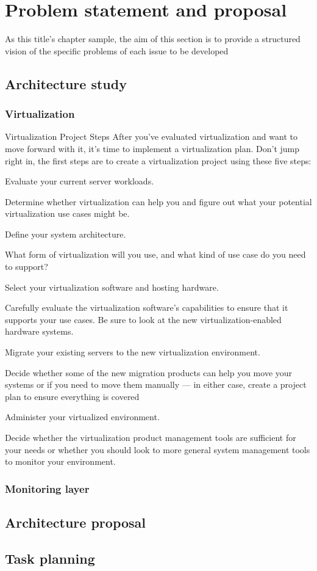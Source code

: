 \chapter{Problem statement and proposal}\label{B:problemStatementAndProposal}

As this title's chapter sample, the aim of this section is to provide a structured vision of the specific problems of each issue to be developed 




\section{Architecture study}
\subsection{Virtualization}

Virtualization Project Steps
After you’ve evaluated virtualization and want to move forward with it, it’s time to implement a virtualization plan. Don’t jump right in, the first steps are to create a virtualization project using these five steps:

Evaluate your current server workloads.

Determine whether virtualization can help you and figure out what your potential virtualization use cases might be.

Define your system architecture.

What form of virtualization will you use, and what kind of use case do you need to support?

Select your virtualization software and hosting hardware.

Carefully evaluate the virtualization software’s capabilities to ensure that it supports your use cases. Be sure to look at the new virtualization-enabled hardware systems.

Migrate your existing servers to the new virtualization environment.

Decide whether some of the new migration products can help you move your systems or if you need to move them manually — in either case, create a project plan to ensure everything is covered

Administer your virtualized environment.

Decide whether the virtualization product management tools are sufficient for your needs or whether you should look to more general system management tools to monitor your environment.

\subsection{Monitoring layer}
\section{Architecture proposal}
\section{Task planning}



